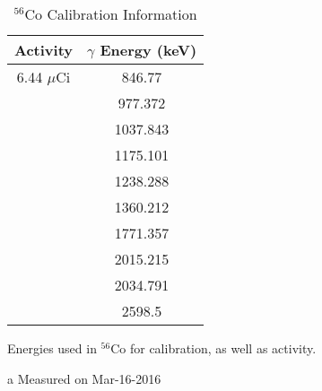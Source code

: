 \begin{table}[t]
    \centering
    \caption{$^{56}$Co Calibration Information}
    \label{tab:Co_Energy}
    \begin{threeparttable}
    \begin{tabular}{c|c}
    \toprule
         Activity & $\gamma$ Energy (keV)  \\ \hline
         6.44 $\mu$Ci\tnote{a} & 846.77 \\
         & 977.372 \\
         & 1037.843 \\
         & 1175.101 \\
         & 1238.288 \\
         & 1360.212 \\
         & 1771.357 \\
         & 2015.215 \\
         & 2034.791 \\
         & 2598.5 \\
         \bottomrule
    \end{tabular}
    \begin{tablenotes}[para]
    Energies used in $^{56}$Co for calibration, as well as activity.
    \newline\item[a] Measured on Mar-16-2016
    \end{tablenotes} 
\end{threeparttable}
\end{table}